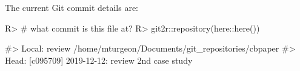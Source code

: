 \documentclass[
]{jss}
\begin{document}
The current Git commit details are:

\begin{CodeChunk}

\begin{CodeInput}
R> # what commit is this file at? 
R> git2r::repository(here::here())
\end{CodeInput}

\begin{CodeOutput}
#> Local:    review /home/mturgeon/Documents/git_repositories/cbpaper
#> Head:     [c095709] 2019-12-12: review 2nd case study
\end{CodeOutput}
\end{CodeChunk}


\end{document}
